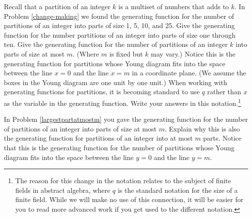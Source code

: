 \iteme  Recall that a partition of an integer $k$ is a multiset of numbers
that adds to $k$.  In Problem \ref{change-making} we found the
generating function for the number of partitions of an integer into parts
of size 1, 5, 10, and 25.   Give the generating function for the number
partitions of an integer into parts of size one through ten.  Give the
generating function for the number of partitions of an integer $k$ into
parts of size at most $m$. (Where $m$ is fixed but $k$ may vary.)  Notice this
is the generating function for partitions whose Young diagram fits into the space
between the line
$x=0$ and the line $x=m$ in a coordinate plane.  (We assume the boxes in the
Young diagram are one unit by one unit.)\label{largestpartatmostm}  When
working with generating functions for partitions, it is becoming standard
to use $q$ rather than $x$ as the variable in the generating function. 
Write your answers in this notation.\footnote{The reason for this change
in the notation relates to the subject of finite fields in abstract
algebra, where $q$ is the standard notation for the size of a finite
field.  While we will make no use of this connection, it will be easier
for you to read more advanced work if you get used to the different
notation.}

\iteme In Problem \ref{largestpartatmostm} you gave the generating
function for the number of partitions of an integer into parts of size at
most
$m$.  Explain why this is also the generating function for partitions of
an integer into at most $m$ parts.  Notice that this is the generating
function for the number of partitions whose Young diagram fits into the
space between the line $y=0$ and the line $y=m$.\label{atmostmparts}



